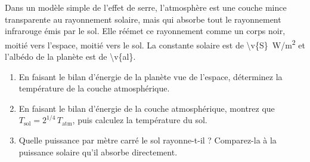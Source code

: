 Dans un modèle simple de l'effet de serre, l'atmosphère est une couche mince transparente au rayonnement solaire, mais qui absorbe tout le rayonnement infrarouge émis par le sol. Elle réémet ce rayonnement comme un corps noir, moitié vers l'espace, moitié vers le sol. La constante solaire est de \qty{\v{S}}{W/m^2} et l'albédo de la planète est de \num{\v{al}}.

\begin{enumerate}[label=\alph*)]
    \item En faisant le bilan d'énergie de la planète vue de l'espace, déterminez la température de la couche atmosphérique.
    \item En faisant le bilan d'énergie de la couche atmosphérique, montrez que $T_{\text{sol}} = 2^{1/4}\,T_{\text{atm}}$, puis calculez la température du sol.
    \item Quelle puissance par mètre carré le sol rayonne-t-il ? Comparez-la à la puissance solaire qu'il absorbe directement.
\end{enumerate}
